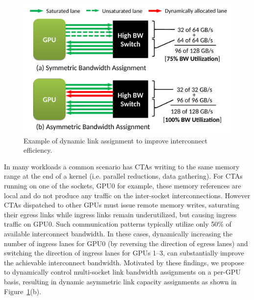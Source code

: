 \begin{figure}[t]
    \centering
    \includegraphics[width=1.0\columnwidth]{figures/link_assignment.pdf}
    \caption{Example of dynamic link assignment to improve interconnect efficiency.}
    \label{fig:symmetric_assymetric}
    \vspace{-.1in}
\end{figure}

In many workloads a common
scenario has CTAs writing to the same memory range at the end of a
kernel (i.e. parallel reductions, data gathering). For CTAs running on one of the
sockets, GPU0 for example, these memory references are local and do not
produce any traffic on the inter-socket interconnections. However CTAs dispatched
to other GPUs must issue remote memory writes, saturating their egress links while
ingress links remain underutilized, but causing ingress traffic on GPU0. 
Such communication patterns typically utilize only
50\% of available interconnect bandwidth. In these cases, dynamically increasing the 
number of ingress lanes for GPU0
(by reversing the direction of egress lanes) and switching the direction of
ingress lanes for GPUs 1--3, can substantially improve the achievable interconnect
bandwidth. Motivated by these findings, we propose to dynamically control multi-socket
link bandwidth assignments on a per-GPU basis, resulting in
dynamic asymmetric link capacity assignments as shown in
Figure~\ref{fig:symmetric_assymetric}(b).  

